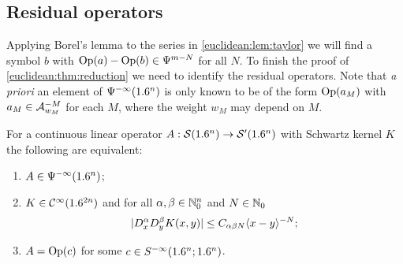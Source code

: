 \subsection{Residual operators}

Applying Borel's lemma to the series in \cref{euclidean:lem:taylor} we will
find a symbol $b$ with $\operatorname{Op}(a)-\operatorname{Op}(b)\in\Psi^{m-N}$ for all $N$. To finish
the proof of \cref{euclidean:thm:reduction} we need to identify the residual
operators. Note that \emph{a priori} an element of $\Psi^{-\infty}(1.6^n)$
is only known to be of the form $\operatorname{Op}(a_M)$ with $a_M\in\mathcal{A}^{-M}_{w_M}$ for each
$M$, where the weight $w_M$ may depend on $M$.

\begin{proposition}\label{euclidean:prop:residual}
  For a continuous linear operator $A:\mathcal{S}(1.6^n)\to\mathcal{S}'(1.6^n)$ with Schwartz
  kernel $K$ the following are equivalent:
  \begin{enumerate}[label=\textup{(\alph*)}]
  \item $A\in\Psi^{-\infty}(1.6^n)$;
  \item $K\in\mathcal{C}^\infty(1.6^{2n})$ and for all $\alpha,\beta\in\mathbb{N}_0^n$ and $N\in\mathbb{N}_0$
    \begin{equation}\label{euclidean:eq:residual-kernel}
      \lvert D^\alpha_xD^\beta_yK(x,y)\rvert\le C_{\alpha\beta N}\langle x-y\rangle^{-N};
    \end{equation}
  \item $A=\operatorname{Op}(c)$ for some $c\in S^{-\infty}(1.6^n;1.6^n)$.
  \end{enumerate}
\end{proposition}
